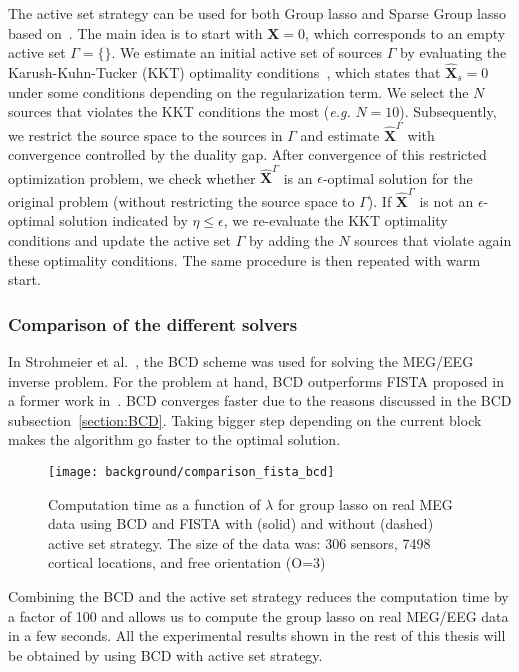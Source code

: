 The active set strategy can be used for both Group \ac{lasso} and Sparse Group \ac{lasso} based on~\cite{roth2008group,wang2014two}. The main idea is to start with $\mathbf{X}=0$, which corresponds to an empty active set $\Gamma=\{\}$. We estimate an initial active set of sources $\Gamma$ by evaluating the Karush-Kuhn-Tucker (KKT) optimality conditions~\cite{roth2008group,wang2014two}, which states that $\hat{\mathbf{X}}_s=0$ under some conditions depending on the regularization term. We select the $N$ sources that violates the KKT conditions the most (\textit{e.g.} $N=10$). Subsequently, we restrict the source space to the sources in $\Gamma$ and estimate $\hat{\mathbf{X}}^{\Gamma}$ with convergence controlled by the duality gap. After convergence of this restricted optimization problem, we check whether $\hat{\mathbf{X}}^{\Gamma}$ is an $\epsilon$-optimal solution for the original problem (without restricting the source space to $\Gamma$). If $\hat{\mathbf{X}}^{\Gamma}$ is not an $\epsilon$-optimal solution indicated by $\eta \leq \epsilon$, we re-evaluate the KKT optimality conditions and update the active set $\Gamma$ by adding the $N$ sources that violate again these optimality conditions. The same procedure is then repeated with warm start.


\subsubsection*{Comparison of the different solvers}\label{section:comparison_solvers}
In Strohmeier et al.~\cite{strohmeier-etal:16}, the BCD scheme was used for solving the MEG/EEG inverse problem. For the problem at hand, BCD outperforms FISTA proposed in a former work in~\cite{gramfort2012mixed}. BCD converges faster due to the reasons discussed in the BCD subsection~\ref{section:BCD}. Taking bigger step depending on the current block makes the algorithm go faster to the optimal solution.

\begin{figure}
	\centering
	\texttt{[image: background/comparison\_fista\_bcd]}
    \caption{Computation time as a function of $\lambda$ for group \ac{lasso} on real MEG data using BCD and FISTA with (solid) and without (dashed) active set strategy. The size of the data was: 306 sensors, 7498 cortical locations, and free orientation (O=3)}
    \label{fig:comparison_fista_bcd}
\end{figure}
Combining the BCD and the active set strategy reduces the computation time by a factor of 100 and allows us to compute the group \ac{lasso} on real MEG/EEG data in a few seconds. All the experimental results shown in the rest of this thesis will be obtained by using BCD with active set strategy.

